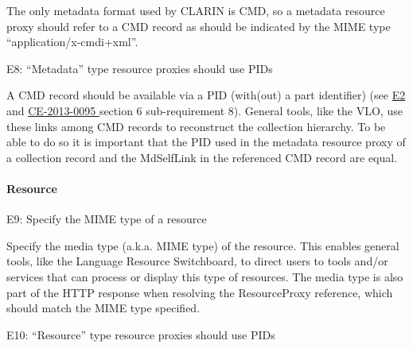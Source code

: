 
The only metadata format used by CLARIN is CMD, so a metadata resource proxy should refer to a CMD record as should be indicated by the MIME type ``application/x-cmdi+xml''.

\label{e8}
E8: ``Metadata'' type resource proxies should use PIDs


A CMD record should be available via a PID (with(out) a part identifier) (see \hyperref[e2]{E2} and \href{http://hdl.handle.net/1839/00-DOCS.CLARIN.EU-78}{CE-2013-0095 \cite{ce20130095}} section 6 sub-requirement 8). General tools, like the VLO, use these links among CMD records to reconstruct the collection hierarchy. To be able to do so it is important that the PID used in the metadata resource proxy of a collection record and the MdSelfLink in the referenced CMD record are equal.

\paragraph{Resource}\label{resource}

E9: Specify the MIME type of a resource




Specify the media type (a.k.a. MIME type) of the resource. This enables general tools, like the Language Resource Switchboard, to direct users to tools and/or services that can process or display this type of resources. The media type is also part of the HTTP response when resolving the ResourceProxy reference, which should match the MIME type specified.

E10: ``Resource'' type resource proxies should use PIDs


